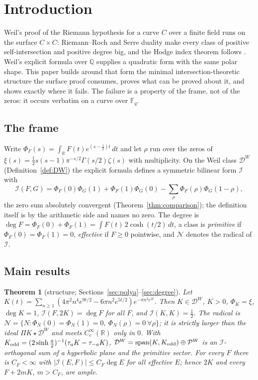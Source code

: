 \documentclass[11pt]{amsart}
\newtheorem{mainthm}{Theorem}
\theoremstyle{definition}
\theoremstyle{remark}
\newcommand{\R}{\mathbb R}
\newcommand{\Q}{\mathbb Q}
\newcommand{\F}{\mathbb F}
\newcommand{\DW}{\mathcal D^{W}}
\newcommand{\PW}{\mathcal P^{W}}
\newcommand{\Nr}{\mathcal N}
\newcommand{\I}{\mathcal I}
\newcommand{\dg}{\deg}
\begin{document}
\section{Introduction}\label{sec:intro}

Weil's proof of the Riemann hypothesis for a curve $C$ over a finite field runs on the surface
$C\times C$: Riemann--Roch and Serre duality make every class of positive self-intersection and
positive degree big, and the Hodge index theorem follows \cite[Ch.~V, 1.9]{Hartshorne}. Weil's
explicit formula over $\Q$ supplies a quadratic form with the same polar shape. This paper builds
around that form the minimal intersection-theoretic structure the surface proof consumes, proves
what can be proved about it, and shows exactly where it fails. The failure is a property of the
frame, not of the zeros: it occurs verbatim on a curve over $\F_q$.

\subsection{The frame}
Write $\Phi_F(s)=\int_\R F(t)e^{(s-\frac12)t}\,dt$ and let $\rho$ run over the zeros of
$\xi(s)=\frac12s(s-1)\pi^{-s/2}\Gamma(s/2)\zeta(s)$ with multiplicity. On the Weil class $\DW$
(Definition~\ref{def:DW}) the explicit formula defines a symmetric bilinear form $\I$ with
\[
\I(F,G)=\Phi_F(0)\Phi_G(1)+\Phi_F(1)\Phi_G(0)-\sum_\rho\Phi_F(\rho)\Phi_G(1-\rho),
\]
the zero sum absolutely convergent (Theorem~\ref{thm:comparison}); the definition itself is by the
arithmetic side and names no zero. The degree is $\dg F=\Phi_F(0)+\Phi_F(1)=\int F(t)\,2\cosh(t/2)\,dt$,
a class is \emph{primitive} if $\Phi_F(0)=\Phi_F(1)=0$, \emph{effective} if $F\ge0$ pointwise, and
$\Nr$ denotes the radical of $\I$.

\subsection{Main results}
\begin{mainthm}[structure; Sections~\ref{sec:polya}--\ref{sec:degree}]\label{thmA}
Let $K(t)=\sum_{n\ge1}(4\pi^2n^4e^{9t/2}-6\pi n^2e^{5t/2})e^{-\pi n^2e^{2t}}$. Then $K\in\DW$, $K>0$,
$\Phi_K=\xi$, $\dg K=1$, $\I(F,2K)=\dg F$ for all $F$, and $\I(K,K)=\frac12$. The radical is
$\Nr=\{N:\Phi_N(0)=\Phi_N(1)=0,\ \Phi_N(\rho)=0\ \forall\rho\}$; it is strictly larger than the ideal
$\Pi K\star\DW$ and meets $C_c^\infty(\R)$ only in $0$. With $K_{\rm odd}=(2\sinh\frac a2)^{-1}(\tau_aK-\tau_{-a}K)$,
$\DW=\mathrm{span}(K,K_{\rm odd})\oplus\PW$ is an $\I$-orthogonal sum of a hyperbolic plane and the
primitive sector. For every $F$ there is $C_F<\infty$ with $|\I(E,F)|\le C_F\dg E$ for all effective
$E$; hence $2K$ and every $F+2mK$, $m>C_F$, are ample.
\end{mainthm}
\end{document}
